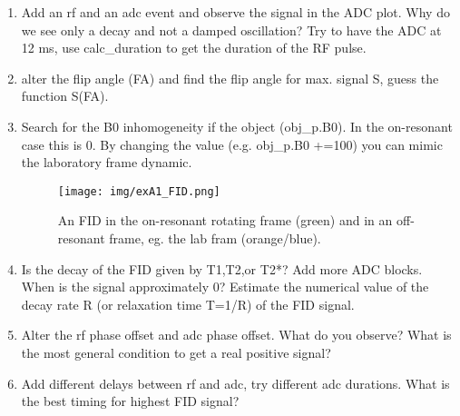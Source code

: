 \documentclass[a4paper,12pt]{extarticle}
\begin{document}
\begin{enumerate}

\item 	Add an rf and an adc event and observe the signal in the ADC plot. Why do we see only a decay and not a damped oscillation?  Try to have the ADC at 12 ms, use calc\_duration to get the duration of the RF pulse.
		
\item 	alter the flip angle (FA) and find the flip angle for max. signal S, guess the function S(FA).
		
		
\item  Search for the B0 inhomogeneity if the object (obj\_p.B0). In the on-resonant case this is 0. By changing the value (e.g. obj\_p.B0 +=100) you can mimic the laboratory frame dynamic. 
\begin{figure}[H] 
\centering
\texttt{[image: img/exA1\_FID.png]}
\caption{An FID in the on-resonant rotating frame (green) and in an off-resonant frame, eg. the lab fram (orange/blue). } \label{fig:exA1_FID}
\end{figure}


\item  Is the decay of the FID given by T1,T2,or T2*? Add more ADC blocks. When is the signal approximately 0?  Estimate the numerical value of the decay rate R (or relaxation time T=1/R) of the FID signal.

\item  Alter the rf phase offset and adc phase offset. What do you observe? What is the most general condition to get a real positive signal?
		
\item  Add different delays between rf and adc, try different adc durations. What is the best timing for highest FID signal?


\end{enumerate}
\end{document}
